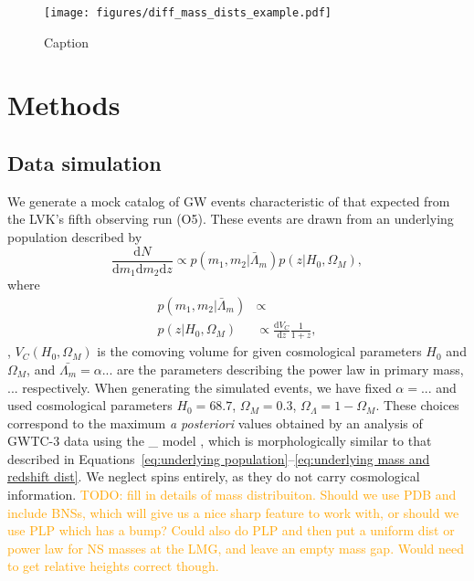 \documentclass[]{aastex631}
\newcommand{\Ho}{$H_0$}
\newcommand{\Omm}{$\Omega_M$}
\newcommand{\diff}{\text{d}}
\newcommand{\comment}[1]{\textcolor{orange}{#1}}
\begin{document}
\begin{figure}
    \centering
    \texttt{[image: figures/diff\_mass\_dists\_example.pdf]}
    \caption{Caption}
    \label{fig:motivation}
\end{figure}

\section{Methods}
\label{sec:methods}
\subsection{Data simulation}
We generate a mock catalog of GW events characteristic of that expected from the LVK's fifth observing run (O5). 
These events are drawn from an underlying population described by
\begin{equation}
\label{eq:underlying population}
    \frac{\diff N}{\diff m_1 \diff m_2 \diff z} \propto p(m_1, m_2|\bar{\Lambda}_m) p(z|H_0, \Omega_M),
\end{equation}
where 
\begin{align}
    p(m_1,m_2|\bar{\Lambda}_m) &\propto \\
    p(z|H_0, \Omega_M) &\propto \frac{\diff V_C}{\diff z} \frac{1}{1+z},
\label{eq:underlying mass and redshift dist}
\end{align}
, $V_C(H_0, \Omega_M)$ is the comoving volume for given cosmological parameters \Ho{} and \Omm{}, and $\bar{\Lambda_m} = \alpha$... are the parameters describing the power law in primary mass, ... respectively. 
When generating the simulated events, we have fixed $\alpha= $... and used cosmological parameters \Ho$=68.7$, \Omm$=0.3$, $\Omega_\Lambda=1-\Omega_M$.
These choices correspond to the maximum \emph{a posteriori} values obtained by an analysis of GWTC-3 data using the \_ model \cite{o3b_pop}, which is morphologically similar to that described in Equations~\ref{eq:underlying population}--\ref{eq:underlying mass and redshift dist}.
We neglect spins entirely, as they do not carry cosmological information.
\comment{TODO: fill in details of mass distribuiton. Should we use PDB and include BNSs, which will give us a nice sharp feature to work with, or should we use PLP which has a bump? Could also do PLP and then put a uniform dist or power law for NS masses at the LMG, and leave an empty mass gap. Would need to get relative heights correct though.}
\end{document}
